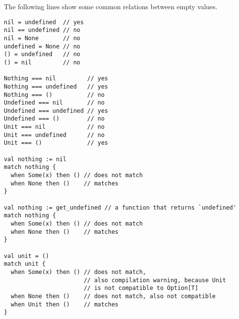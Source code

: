 The following lines show some common relations between empty values. 
\begin{lstlisting}
nil = undefined  // yes
nil == undefined // no
nil = None       // no
undefined = None // no
() = undefined   // no
() = nil         // no

Nothing === nil         // yes
Nothing === undefined   // yes
Nothing === ()          // no
Undefined === nil       // no
Undefined === undefined // yes
Undefined === ()        // no
Unit === nil            // no
Unit === undefined      // no
Unit === ()             // yes

val nothing := nil
match nothing {
  when Some(x) then () // does not match
  when None then ()    // matches
}

val nothing := get_undefined // a function that returns `undefined'
match nothing {
  when Some(x) then () // does not match
  when None then ()    // matches
}

val unit = ()
match unit {
  when Some(x) then () // does not match, 
                       // also compilation warning, because Unit 
                       // is not compatible to Option[T]
  when None then ()    // does not match, also not compatible
  when Unit then ()    // matches
}
\end{lstlisting}







